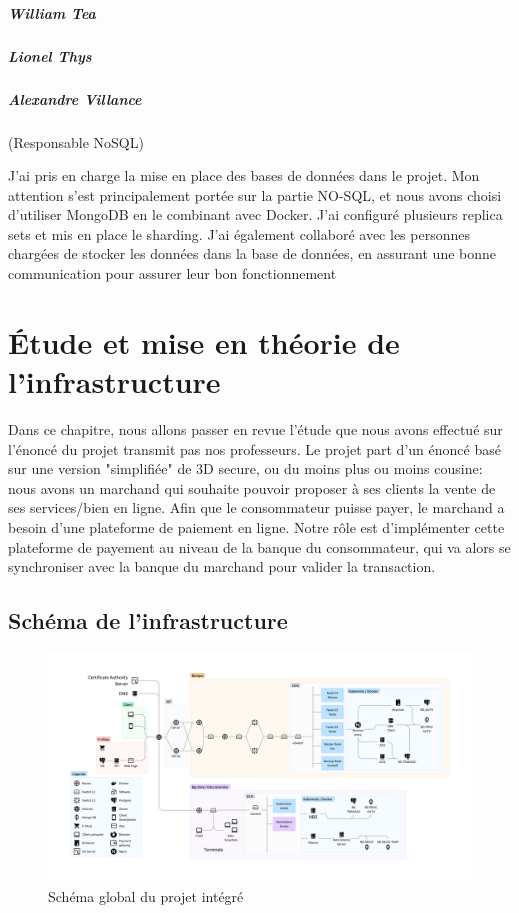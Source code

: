 \paragraph{William Tea}
\paragraph{Lionel Thys}
\paragraph{Alexandre Villance} (Responsable NoSQL)

J'ai pris en charge la mise en place des bases de données dans le projet. Mon attention s'est
principalement portée sur la partie NO-SQL, et nous avons choisi d'utiliser MongoDB en le combinant
avec Docker. J'ai configuré plusieurs replica sets et mis en place le sharding. J'ai également collaboré
avec les personnes chargées de stocker les données dans la base de données, en assurant une bonne
communication pour assurer leur bon fonctionnement

\chapter{Étude et mise en théorie de l'infrastructure}

Dans ce chapitre, nous allons passer en revue l'étude que nous avons effectué sur l'énoncé du projet transmit pas nos professeurs. Le projet part d'un énoncé basé sur une version "simplifiée" de 3D secure, ou du moins plus ou moins cousine: nous avons un marchand qui souhaite pouvoir proposer à ses clients la vente de ses services/bien en ligne. Afin que le consommateur puisse payer, le marchand a besoin d'une plateforme de paiement en ligne. Notre rôle est d'implémenter cette plateforme de payement au niveau de la banque du consommateur, qui va alors se synchroniser avec la banque du marchand pour valider la transaction.

\section{Schéma de l'infrastructure}

\begin{figure}[H]
    \centering
    \includegraphics[width=\textwidth]{./img/Schéma Projet Intégré.png}
    \caption{Schéma global du projet intégré}
    \label{fig:infrastructure}
\end{figure}